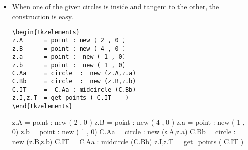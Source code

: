 \begin{enumerate}[label=(\roman*)]
\begin{itemize}
\begin{minipage}{.4\textwidth}
\begin{verbatim}
\begin{tkzelements}
scale=.75
local a,b,c,d
z.A = point : new ( 0 , 0 )
z.B = point : new ( 4 , 0 )
z.a = point :  new ( 1 , 0)
z.b = point :  new ( 1 , 0)
C.Aa = circle  :  new (z.A,z.a)
C.Bb = circle  :  new (z.B,z.b)
L.AB = line :  new (z.A,z.B)
z.E = C.Aa.north
z.F = C.Bb.north
L.EF = line :  new (z.E,z.F)
C.IT =  C.Aa : midcircle (C.Bb)
z.I,z.T = get_points (	C.IT	) 
L.TF = C.Bb : tangent_from (z.I)
z.H = intersection (L.TF,C.IT)
z.E = intersection (L.TF,C.Aa)
z.F=L.TF.pb
\end{tkzelements}
\end{verbatim}
\end{minipage}
\begin{minipage}{.6\textwidth}
\begin{tkzelements}
scale=.75
local a,b,c,d
z.A = point : new ( 0 , 0 )
z.B = point : new ( 4 , 0 )
z.a = point :  new ( 1 , 0)
z.b = point :  new ( 1 , 0)
C.Aa = circle  :  new (z.A,z.a)
C.Bb = circle  :  new (z.B,z.b)
L.AB = line :  new (z.A,z.B)
z.E = C.Aa.north
z.F = C.Bb.north
L.EF = line :  new (z.E,z.F)
C.IT =  C.Aa : midcircle (C.Bb)
z.I,z.T = get_points (	C.IT	) 
L.TF = C.Bb : tangent_from (z.I)
z.H = intersection (L.TF,C.IT)
z.E = intersection (L.TF,C.Aa)
z.F=L.TF.pb
\end{tkzelements}
\end{minipage}


\item   When one of the given circles is inside and tangent to the other, the construction is easy. 

\begin{minipage}{.4\textwidth}
\begin{verbatim}
\begin{tkzelements}
z.A      = point : new ( 2 , 0 )
z.B      = point : new ( 4 , 0 )
z.a      = point :  new ( 1 , 0)
z.b      = point :  new ( 1 , 0)
C.Aa     = circle  :  new (z.A,z.a)
C.Bb     = circle  :  new (z.B,z.b)
C.IT     =  C.Aa : midcircle (C.Bb)
z.I,z.T  = get_points (	C.IT	)
\end{tkzelements}
\end{verbatim}
\end{minipage}
\begin{minipage}{.6\textwidth}
\begin{tkzelements}
z.A = point : new ( 2 , 0 )
z.B = point : new ( 4 , 0 )
z.a = point :  new ( 1 , 0)
z.b = point :  new ( 1 , 0)
C.Aa = circle  :  new (z.A,z.a)
C.Bb = circle  :  new (z.B,z.b)
C.IT =  C.Aa : midcircle (C.Bb)
z.I,z.T = get_points (	C.IT	) 
\end{tkzelements}


\end{minipage}
\end{itemize}
\end{enumerate}

